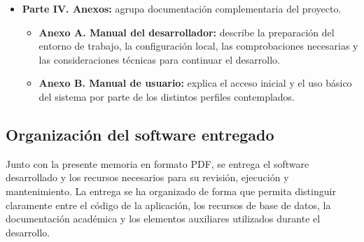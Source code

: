 \begin{itemize}
    \item \textbf{Parte IV. Anexos:} agrupa documentación complementaria del proyecto.
          \begin{itemize}
              \item \textbf{Anexo A. Manual del desarrollador:} describe la preparación del entorno de trabajo, la configuración local, las comprobaciones necesarias y las consideraciones técnicas para continuar el desarrollo.
              \item \textbf{Anexo B. Manual de usuario:} explica el acceso inicial y el uso básico del sistema por parte de los distintos perfiles contemplados.
          \end{itemize}

\end{itemize}

\subsection{Organización del software entregado}
Junto con la presente memoria en formato PDF, se entrega el software desarrollado y los recursos necesarios para su revisión, ejecución y mantenimiento. La entrega se ha organizado de forma que permita distinguir claramente entre el código de la aplicación, los recursos de base de datos, la documentación académica y los elementos auxiliares utilizados durante el desarrollo.

